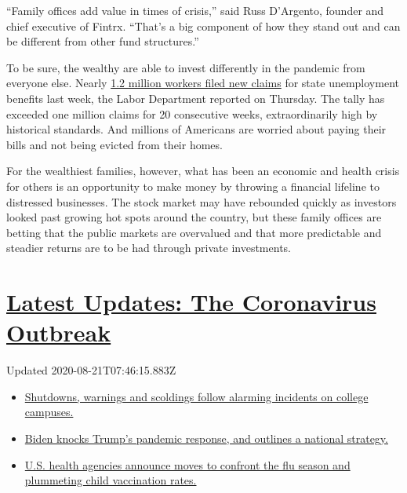 ``Family offices add value in times of crisis,'' said Russ D'Argento,
founder and chief executive of Fintrx. ``That's a big component of how
they stand out and can be different from other fund structures.''

To be sure, the wealthy are able to invest differently in the pandemic
from everyone else. Nearly
\href{https://www.nytimes3xbfgragh.onion/live/2020/08/06/business/stock-market-today-coronavirus/new-state-jobless-claims-decline-but-exceed-one-million-for-the-20th-week}{1.2
million workers filed new claims} for state unemployment benefits last
week, the Labor Department reported on Thursday. The tally has exceeded
one million claims for 20 consecutive weeks, extraordinarily high by
historical standards. And millions of Americans are worried about paying
their bills and not being evicted from their homes.

For the wealthiest families, however, what has been an economic and
health crisis for others is an opportunity to make money by throwing a
financial lifeline to distressed businesses. The stock market may have
rebounded quickly as investors looked past growing hot spots around the
country, but these family offices are betting that the public markets
are overvalued and that more predictable and steadier returns are to be
had through private investments.

\hypertarget{latest-updates-the-coronavirus-outbreak}{%
\section{\texorpdfstring{\href{https://www.nytimes3xbfgragh.onion/2020/08/20/world/coronavirus-covid.html?action=click\&pgtype=Article\&state=default\&region=MAIN_CONTENT_1\&context=storylines_live_updates}{Latest
Updates: The Coronavirus
Outbreak}}{Latest Updates: The Coronavirus Outbreak}}\label{latest-updates-the-coronavirus-outbreak}}

Updated 2020-08-21T07:46:15.883Z

\begin{itemize}
\tightlist
\item
  \href{https://www.nytimes3xbfgragh.onion/2020/08/20/world/coronavirus-covid.html?action=click\&pgtype=Article\&state=default\&region=MAIN_CONTENT_1\&context=storylines_live_updates\#link-68774d88}{Shutdowns,
  warnings and scoldings follow alarming incidents on college campuses.}
\item
  \href{https://www.nytimes3xbfgragh.onion/2020/08/20/world/coronavirus-covid.html?action=click\&pgtype=Article\&state=default\&region=MAIN_CONTENT_1\&context=storylines_live_updates\#link-26b58724}{Biden
  knocks Trump's pandemic response, and outlines a national strategy.}
\item
  \href{https://www.nytimes3xbfgragh.onion/2020/08/20/world/coronavirus-covid.html?action=click\&pgtype=Article\&state=default\&region=MAIN_CONTENT_1\&context=storylines_live_updates\#link-4e542da3}{U.S.
  health agencies announce moves to confront the flu season and
  plummeting child vaccination rates.}
\end{itemize}

